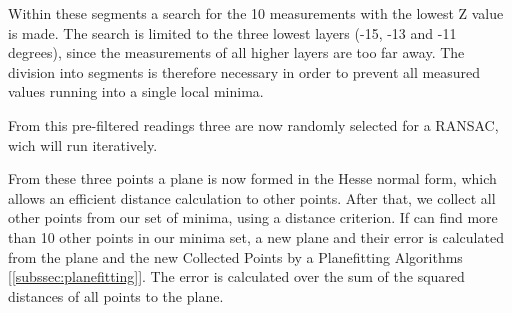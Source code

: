 \documentclass[11pt,oneside,openright]{mpreport}
\begin{document}



Within these segments a search for the 10 measurements with the lowest Z value is made. The search is limited to the three lowest layers (-15, -13 and -11 degrees),
since the measurements of all higher layers are too far away. The division into segments is therefore necessary in order to prevent all measured values running into a single local minima. 


From this pre-filtered readings three are now randomly selected for a \ac{RANSAC}, wich will run iteratively.

From these three points a plane is now formed in the Hesse normal form, which allows an efficient distance calculation to other points.
After that, we collect all other points from our set of minima, using a distance criterion. 
If can find more than 10 other points in our minima set, a new plane and their error is calculated from the plane and the new Collected Points by a Planefitting Algorithms [\cref{subssec:planefitting}].
The error is calculated over the sum of the squared distances of all points to the plane.
\end{document}

